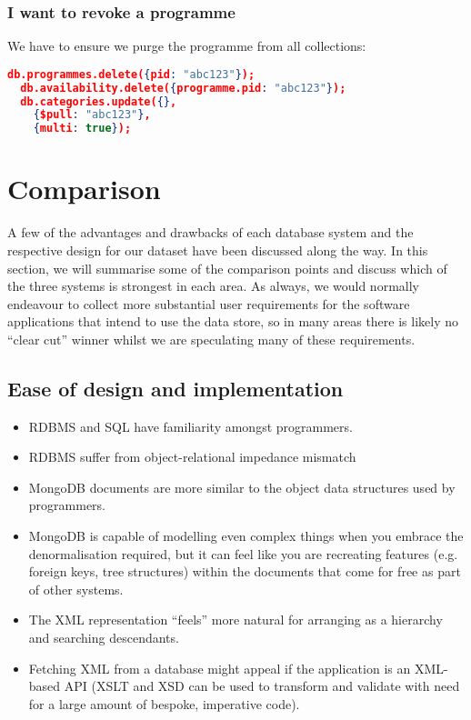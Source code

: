 \documentclass[11pt,a4paper]{article}
\begin{document}
\subsubsection{I want to revoke a programme}

We have to ensure we purge the programme from all collections:

\begin{lstlisting}[language=json]
  db.programmes.delete({pid: "abc123"});
  db.availability.delete({programme.pid: "abc123"});
  db.categories.update({},
    {$pull: "abc123"},
    {multi: true});
\end{lstlisting}

\section{Comparison}

A few of the advantages and drawbacks of each database system
and the respective design for our dataset have been discussed along
the way. In this section, we will summarise some of the comparison
points and discuss which of the three systems is strongest in each
area. As always, we would normally endeavour to collect more
substantial user requirements for the software applications
that intend to use the data store, so in many areas there
is likely no ``clear cut'' winner whilst we are speculating many
of these requirements.

\subsection{Ease of design and implementation}

\begin{itemize}
  \item RDBMS and SQL have familiarity amongst programmers.
  \item RDBMS suffer from object-relational impedance mismatch
  \item MongoDB documents are more similar to the object data
    structures used by programmers.
  \item MongoDB is capable of modelling even complex things
    when you embrace the denormalisation required, but it can
    feel like you are recreating features (e.g. foreign keys,
    tree structures) within the documents that come for free as
    part of other systems.
  \item The XML representation ``feels'' more natural for arranging
    as a hierarchy and searching descendants.
  \item Fetching XML from a database might appeal if the application
    is an XML-based API (XSLT and XSD can be used to transform
    and validate with need for a large amount of bespoke, imperative
    code).
\end{itemize}
\end{document}
